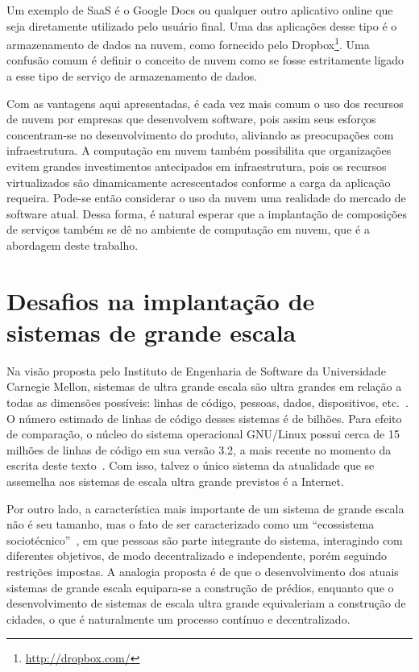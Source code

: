 Um exemplo de SaaS é o Google Docs ou qualquer outro aplicativo online que seja diretamente utilizado pelo usuário final. Uma das aplicações desse tipo é o armazenamento de dados na nuvem, como fornecido pelo Dropbox\footnote{\url{http://dropbox.com/}}. Uma confusão comum é definir o conceito de nuvem como se fosse estritamente ligado a esse tipo de serviço de armazenamento de dados.

Com as vantagens aqui apresentadas, é cada vez mais comum o uso dos recursos de nuvem por empresas que desenvolvem software, pois assim seus esforços concentram-se no desenvolvimento do produto, aliviando as preocupações com infraestrutura. A computação em nuvem também possibilita que organizações evitem grandes investimentos antecipados em infraestrutura, pois os recursos virtualizados são dinamicamente acrescentados conforme a carga da aplicação requeira. Pode-se então considerar o uso da nuvem uma realidade do mercado de software atual. Dessa forma, é natural esperar que a implantação de composições de serviços também se dê no ambiente de computação em nuvem, que é a abordagem deste trabalho. 

\section{Desafios na implantação de sistemas de grande escala}
\label{sec:desafios}

Na visão proposta pelo Instituto de Engenharia de Software da Universidade Carnegie Mellon, sistemas de ultra grande escala são ultra grandes em relação a todas as dimensões possíveis: linhas de código, pessoas, dados, dispositivos, etc.~\cite{CarnegieMellon2006ULS}. O número estimado de linhas de código desses sistemas é de bilhões. Para efeito de comparação, o núcleo do sistema operacional GNU/Linux possui cerca de 15 milhões de linhas de código em sua versão 3.2, a mais recente no momento da escrita deste texto~\cite{Leemhuis2012Statistics}. Com isso, talvez o único sistema da atualidade que se assemelha aos sistemas de escala ultra grande previstos é a Internet. 

Por outro lado, a característica mais importante de um sistema de grande escala não é seu tamanho, mas o fato de ser caracterizado como um ``ecossistema sociotécnico''~\cite{CarnegieMellon2006ULS}, em que pessoas são parte integrante do sistema, interagindo com diferentes objetivos, de modo decentralizado e independente, porém seguindo restrições impostas. A analogia proposta é de que o desenvolvimento dos atuais sistemas de grande escala equipara-se a construção de prédios, enquanto que o desenvolvimento de sistemas de escala ultra grande equivaleriam a construção de cidades, o que é naturalmente um processo contínuo e decentralizado.

